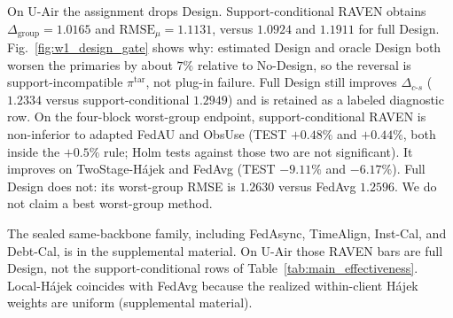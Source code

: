 \documentclass[letterpaper,journal]{IEEEtran}
\begin{document}
On U-Air the assignment drops Design.  Support-conditional RAVEN obtains
$\Delta_{\mathrm{group}}=1.0165$ and $\mathrm{RMSE}_{\mu}=1.1131$,
versus $1.0924$ and $1.1911$ for full Design.  Fig.~\ref{fig:w1_design_gate}
shows why: estimated Design and oracle Design both worsen the
primaries by about $7\%$ relative to No-Design, so the reversal is
support-incompatible $\pi^{\mathrm{tar}}$, not plug-in failure.
Full Design still improves $\Delta_{c\text{-}s}$ ($1.2334$ versus
support-conditional $1.2949$) and is retained as a labeled diagnostic row.  On the
four-block worst-group endpoint, support-conditional RAVEN is non-inferior to
adapted FedAU and ObsUse (TEST $+0.48\%$ and $+0.44\%$, both inside
the $+0.5\%$ rule; Holm tests against those two are not significant).
It improves on TwoStage-H\'ajek and FedAvg (TEST $-9.11\%$ and
$-6.17\%$).  Full Design does not: its worst-group RMSE is
$1.2630$ versus FedAvg $1.2596$.  We do not claim a best
worst-group method.

The sealed same-backbone family, including FedAsync, TimeAlign,
Inst-Cal, and Debt-Cal, is in the supplemental material.  On U-Air
those RAVEN bars are full Design, not the support-conditional rows of
Table~\ref{tab:main_effectiveness}.  Local-H\'ajek coincides with
FedAvg because the realized within-client H\'ajek weights are uniform
(supplemental material).
\end{document}
